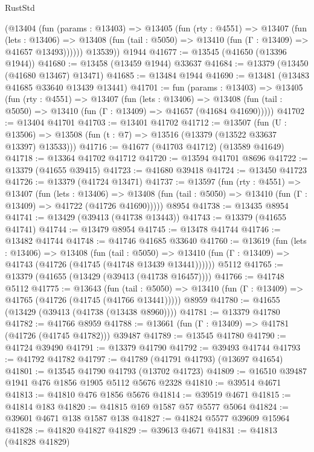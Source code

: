 \begin{lexlean}{RustStd}
\begin{coremodule}
        (@13404
          (fun (params : @13403) =>
          @13405
            (fun (rty : @4551) =>
            @13407
              (fun (lets : @13406) =>
              @13408 (fun (tail : @5050) => @13410 (fun (Γ : @13409) => @41657 @13493))))))
        @13539))
    @1944
@41677 := @13545 (@41650 (@13396 @1944))
@41680 := @13458 (@13459 @1944) @33637
@41684 := @13379 (@13450 (@41680 @13467) @13471)
@41685 := @13484 @1944
@41690 := @13481 (@13483 @41685 @33640 @13439 @13441)
@41701 := fun (params : @13403) =>
  @13405
    (fun (rty : @4551) =>
    @13407
      (fun (lets : @13406) =>
      @13408 (fun (tail : @5050) => @13410 (fun (Γ : @13409) => @41657 (@41684 @41690)))))
@41702 := @13404 @41701
@41703 := @13401 @41702
@41712 := @13507
    (fun (U : @13506) => @13508 (fun (t : @7) => @13516 (@13379 (@13522 @33637 @13397) @13533)))
@41716 := @41677 (@41703 @41712) (@13589 @41649)
@41718 := @13364 @41702 @41712
@41720 := @13594 @41701 @8696
@41722 := @13379 (@41655 @39415)
@41723 := @41680 @39418
@41724 := @13450 @41723
@41726 := @13379 (@41724 @13471)
@41737 := @13597
    (fun (rty : @4551) =>
    @13407
      (fun (lets : @13406) =>
      @13408 (fun (tail : @5050) => @13410 (fun (Γ : @13409) => @41722 (@41726 @41690)))))
    @8954
@41738 := @13435 @8954
@41741 := @13429 (@39413 (@41738 @13443))
@41743 := @13379 (@41655 @41741)
@41744 := @13479 @8954
@41745 := @13478 @41744
@41746 := @13482 @41744
@41748 := @41746 @41685 @33640
@41760 := @13619
    (fun (lets : @13406) =>
    @13408
      (fun (tail : @5050) =>
      @13410 (fun (Γ : @13409) => @41743 (@41726 (@41745 (@41748 @13439 @13441))))))
    @5112
@41765 := @13379 (@41655 (@13429 (@39413 (@41738 @16457))))
@41766 := @41748 @5112
@41775 := @13643
    (fun (tail : @5050) => @13410 (fun (Γ : @13409) => @41765 (@41726 (@41745 (@41766 @13441)))))
    @8959
@41780 := @41655 (@13429 (@39413 (@41738 (@13438 @8960))))
@41781 := @13379 @41780
@41782 := @41766 @8959
@41788 := @13661 (fun (Γ : @13409) => @41781 (@41726 (@41745 @41782))) @39487
@41789 := @13545 @41780
@41790 := @41724 @39490
@41791 := @13379 @41790
@41792 := @39493 @41744
@41793 := @41792 @41782
@41797 := @41789 (@41791 @41793) (@13697 @41654)
@41801 := @13545 @41790 @41793 (@13702 @41723)
@41809 := @16510 @39487 @1941 @476 @1856 @1905 @5112 @5676 @2328
@41810 := @39514 @4671
@41813 := @41810 @476 @1856 @5676
@41814 := @39519 @4671
@41815 := @41814 @183
@41820 := @41815 @169 @1587 @57 @5577 @5064
@41824 := @39601 @4671 @138 @1587 @138
@41827 := @41824 @5577 @39609 @15964
@41828 := @41820 @41827
@41829 := @39613 @4671
@41831 := @41813 (@41828 @41829)

\end{coremodule}
\end{lexlean}
